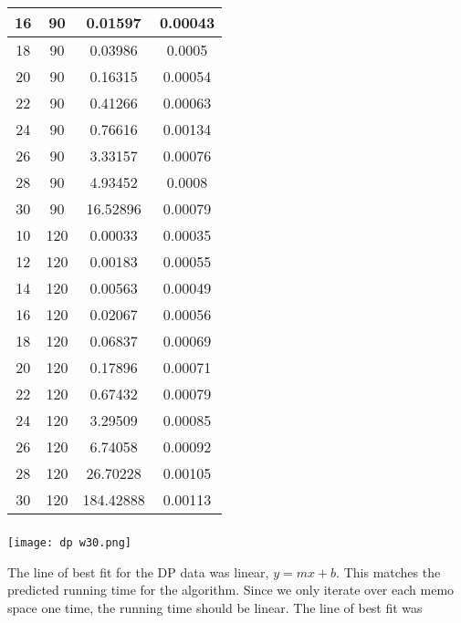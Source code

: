 \documentclass{article}
\begin{document}
\begin{center}
\begin{tabular}{||c c c c||}
        \hline
        16 & 90 & 0.01597 & 0.00043 \\
        \hline
        18 & 90 & 0.03986 & 0.0005 \\
        \hline
        20 & 90 & 0.16315 & 0.00054 \\
        \hline
        22 & 90 & 0.41266 & 0.00063 \\
        \hline
        24 & 90 & 0.76616 & 0.00134 \\
        \hline
        26 & 90 & 3.33157 & 0.00076 \\
        \hline
        28 & 90 & 4.93452 & 0.0008 \\
        \hline
        30 & 90 & 16.52896 & 0.00079 \\
        \hline\hline
        10 & 120 & 0.00033 & 0.00035 \\
        \hline
        12 & 120 & 0.00183 & 0.00055 \\
        \hline
        14 & 120 & 0.00563 & 0.00049 \\
        \hline
        16 & 120 & 0.02067 & 0.00056 \\
        \hline
        18 & 120 & 0.06837 & 0.00069 \\
        \hline
        20 & 120 & 0.17896 & 0.00071 \\
        \hline
        22 & 120 & 0.67432 & 0.00079 \\
        \hline
        24 & 120 & 3.29509 & 0.00085 \\
        \hline
        26 & 120 & 6.74058 & 0.00092 \\
        \hline
        28 & 120 & 26.70228 & 0.00105 \\
        \hline
        30 & 120 & 184.42888 & 0.00113\\
        \hline
        \end{tabular}
    \end{center}
    
\subsubsection*{}

\texttt{[image: dp w30.png]}

The line of best fit for the DP data was linear, $y = mx + b$.  This matches the predicted running time for the algorithm.  Since we only iterate over each memo space one time, the running time should be linear.  The line of best fit was 
\end{document}
